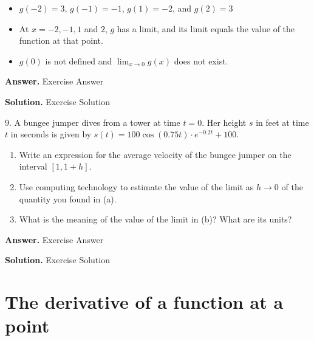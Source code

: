 \documentclass[10pt,]{book}
\theoremstyle{plain}
\theoremstyle{definition}
\theoremstyle{definition}
\theoremstyle{definition}
\theoremstyle{definition}
\theoremstyle{definition}
\numberwithin{equation}{section}
\begin{document}
\begin{exerciselist}
\begin{enumerate}[label=\alph*]
\begin{itemize}[label=\textbullet]
\item{}\(g(-2) = 3\), \(g(-1) = -1\), \(g(1) = -2\), and \(g(2) = 3\)%
\item{}At \(x = -2, -1, 1\) and \(2\), \(g\) has a limit, and its limit equals the value of the function at that point.%
\item{}\(g(0)\) is not defined and \(\lim_{x \to 0} g(x)\) does not exist.%
\end{itemize}
%
\end{enumerate}
\par\smallskip
\par\smallskip
\noindent\textbf{Answer.}\hypertarget{answer-12}{}\quad
Exercise Answer%
\par\smallskip
\noindent\textbf{Solution.}\hypertarget{solution-14}{}\quad
Exercise Solution%
\item[9.]\hypertarget{ez-1-2-Bungee}{}A bungee jumper dives from a tower at time \(t=0\). Her height \(s\) in feet at time \(t\) in seconds is given by \(s(t) = 100\cos(0.75t) \cdot e^{-0.2t}+100\).
\leavevmode%
\begin{enumerate}[label=\alph*]
\item\hypertarget{li-109}{}Write an expression for the average velocity of the bungee jumper on the interval \([1,1+h]\).%
\item\hypertarget{li-110}{}Use computing technology to estimate the value of the limit as \(h \to 0\) of the quantity you found in (a).
\item\hypertarget{li-111}{}What is the meaning of the value of the limit in (b)?  What are its units?%
\end{enumerate}
\par\smallskip
\par\smallskip
\noindent\textbf{Answer.}\hypertarget{answer-13}{}\quad
Exercise Answer%
\par\smallskip
\noindent\textbf{Solution.}\hypertarget{solution-15}{}\quad
Exercise Solution%
\end{exerciselist}
\typeout{************************************************}
\typeout{************************************************}
\section[{The derivative of a function at a point}]{The derivative of a function at a point}\label{sec-1-3-derivative-pt}
\typeout{************************************************}
\typeout{************************************************}
\end{document}

